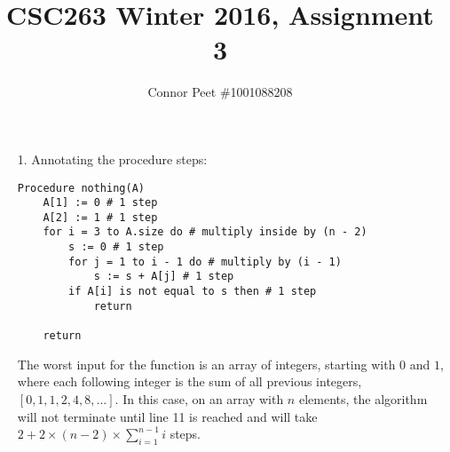 \documentclass{article}
\title{CSC263 Winter 2016, Assignment 3}
\author{Connor Peet \#1001088208}
\begin{document}
\maketitle

\lstset{
    numbers=left
}

\begin{enumerate}
\item [1.]
    Annotating the procedure steps:

    \begin{lstlisting}
Procedure nothing(A)
    A[1] := 0 # 1 step
    A[2] := 1 # 1 step
    for i = 3 to A.size do # multiply inside by (n - 2)
        s := 0 # 1 step
        for j = 1 to i - 1 do # multiply by (i - 1)
            s := s + A[j] # 1 step
        if A[i] is not equal to s then # 1 step
            return

    return
    \end{lstlisting}

    The worst input for the function is an array of integers, starting with $0$ and $1$, where each following integer is the sum of all previous integers, $[0, 1, 1, 2, 4, 8, ...]$. In this case, on an array with $n$ elements, the algorithm will not terminate until line 11 is reached and will take $2 + 2 \times (n - 2) \times \sum_{i = 1}^{n - 1} i$ steps.


\end{enumerate}
\end{document}
